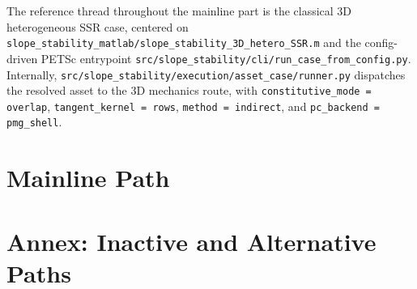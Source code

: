 \documentclass[11pt,a4paper]{report}
\newcommand{\code}[1]{\nolinkurl{#1}}
\newcommand{\matlabpkg}[1]{\nolinkurl{slope_stability_matlab/#1}}
\newcommand{\petscmod}[1]{\nolinkurl{src/slope_stability/#1}}
\begin{document}
The reference thread throughout the mainline part is the classical 3D heterogeneous SSR case, centered on \matlabpkg{slope\_stability\_3D\_hetero\_SSR.m} and the config-driven PETSc entrypoint \petscmod{cli/run\_case\_from\_config.py}. Internally, \petscmod{execution/asset\_case/runner.py} dispatches the resolved asset to the 3D mechanics route, with
\code{constitutive\_mode = overlap},
\code{tangent\_kernel = rows},
\code{method = indirect}, and
\code{pc\_backend = pmg\_shell}.

\tableofcontents
\clearpage
{}

\part{Mainline Path}









\appendix
\part{Annex: Inactive and Alternative Paths}








\end{document}
